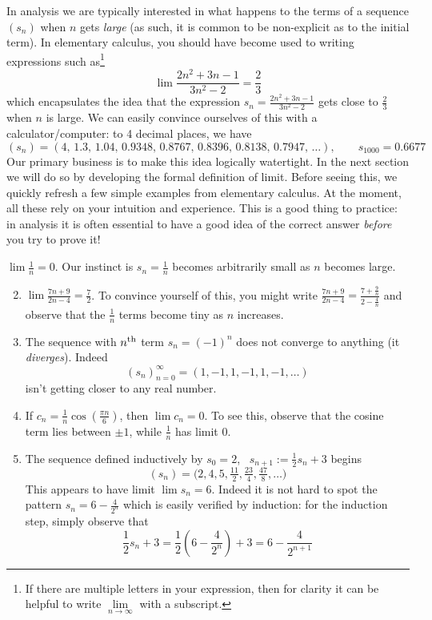 In analysis we are typically interested in what happens to the terms of a sequence $(s_n)$ when $n$ gets \emph{large} (as such, it is common to be non-explicit as to the initial term). In elementary calculus, you should have become used to writing expressions such as\footnote{If there are multiple letters in your expression, then for clarity it can be helpful to write $\lim\limits_{n\to\infty}$ with a subscript.}
\[
	\lim\frac{2n^2+3n-1}{3n^2-2}=\frac 23
\]
which encapsulates the idea that the expression $s_n=\frac{2n^2+3n-1}{3n^2-2}$ gets close to $\frac 23$ when $n$ is large. We can easily convince ourselves of this with a calculator/computer: to 4 decimal places, we have
\[(s_n)=(4,\,1.3,\,1.04,\,
 0.9348,\,
 0.8767,\,
 0.8396,\,
 0.8138,\,
 0.7947,\,\ldots),\qquad s_{1000}=0.6677\]
Our primary business is to make this idea logically watertight. In the next section we will do so by developing the formal definition of limit. Before seeing this, we quickly refresh a few simple examples from elementary calculus. At the moment, all these rely on your intuition and experience. This is a good thing to practice: in analysis it is often essential to have a good idea of the correct answer \emph{before} you try to prove it!

\goodbreak

\begin{examples}{}{}
	\exstart $\lim \frac 1n=0$. Our instinct is $s_n=\frac 1n$ becomes arbitrarily small as $n$ becomes large. 
	\begin{enumerate}\setcounter{enumi}{1}
	  \item $\lim\frac{7n+9}{2n-4}=\frac 72$. To convince yourself of this, you might write $\frac{7n+9}{2n-4}=\frac{7+\frac 9n}{2-\frac 4n}$
	  and observe that the $\frac 1n$ terms become tiny as $n$ increases.
	  \item The sequence with $n\textsuperscript{th}$ term $s_n=(-1)^n$ does not converge to anything (it \emph{diverges}). Indeed
	  \[(s_n)_{n=0}^\infty=(1,-1,1,-1,1,-1,\ldots)\]
	  isn't getting closer to any real number.
	  \item If $c_n=\frac 1n\cos\left(\frac{\pi n}6\right)$, then $\lim c_n=0$. To see this, observe that the cosine term lies between $\pm 1$, while $\frac 1n$ has limit 0.
	  \item The sequence defined inductively by $s_0=2$, \ $s_{n+1}:=\frac 12s_n+3$ begins
	  \[(s_n)=\bigl(2,4,5,\tfrac{11}2,\tfrac{23}4,\tfrac{47}8,\ldots\bigr)\]
	  This appears to have limit $\lim s_n=6$. Indeed it is not hard to spot the pattern $s_n=6-\frac{4}{2^n}$ which is easily verified by induction: for the induction step, simply observe that
	  \[\frac 12s_n+3=\frac 12\left(6-\frac 4{2^n}\right) +3 =6-\frac 4{2^{n+1}}\]
	\end{enumerate}
\end{examples} 


